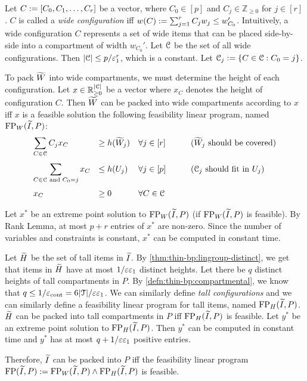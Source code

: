 Let $C := [C_0, C_1, \ldots, C_r]$ be a vector, where
$C_0 \in [p]$ and $C_j \in \mathbb{Z}_{\ge 0}$ for $j \in [r]$.
$C$ is called a \emph{wide configuration} iff
$w(C) := \sum_{j=1}^r C_jw_j \le w_{C_0}'$.
Intuitively, a wide configuration $C$ represents a set of wide items that can be placed
side-by-side into a compartment of width $w_{C_0}'$.
Let $\mathcal{C}$ be the set of all wide configurations.
Then $|\mathcal{C}| \le p/\varepsilon_1^r$, which is a constant.
Let $\mathcal{C}_j := \{C \in \mathcal{C}: C_0 = j\}$.

To pack $\widetilde{W}$ into wide compartments,
we must determine the height of each configuration.
Let $x \in \mathbb{R}_{\ge 0}^{|\mathcal{C}|}$ be a vector where
$x_C$ denotes the height of configuration $C$.
Then $\widetilde{W}$ can be packed into wide compartments according to $x$ iff
$x$ is a feasible solution the following feasibility linear program,
named $\operatorname{FP}_W(\widetilde{I}, P)$:
\[ \begin{array}{*4{>{\displaystyle}l}}
\sum_{C \in \Ccal} C_jx_C &\ge h(\Wtild_j)
    & \forall j \in [r]
    & \qquad\textrm{($\Wtild_j$ should be covered)}
\\[1.75em] \sum_{C \in \Ccal \textrm{ and } C_0 = j} x_C &\le h(U_j)
    & \forall j \in [p]
    & \qquad\textrm{($\Ccal_j$ should fit in $U_j$)}
\\[1.75em] x_C &\ge 0 & \forall C \in \Ccal
\end{array} \]

Let $x^*$ be an extreme point solution to $\operatorname{FP}_W(\widetilde{I}, P)$
(if $\operatorname{FP}_W(\widetilde{I}, P)$ is feasible).
By Rank Lemma, at most $p+r$ entries of $x^*$ are non-zero.
Since the number of variables and constraints is constant,
$x^*$ can be computed in constant time.

Let $\widetilde{H}$ be the set of tall items in $\widetilde{I}$.
By \cref{thm:thin-bp:lingroup-distinct}, we get that items in $\widetilde{H}$
have at most $1/\varepsilon\varepsilon_1$ distinct heights.
Let there be $q$ distinct heights of tall compartments in $P$.
By \cref{defn:thin-bp:compartmental}, we know that $q \le 1/\varepsilon_{\mathrm{cont}} = 6|\mathcal{T}|/\varepsilon\varepsilon_1$.
We can similarly define \emph{tall configurations} and we can similarly define
a feasibility linear program for tall items, named $\operatorname{FP}_H(\widetilde{I}, P)$.
$\widetilde{H}$ can be packed into tall compartments in $P$ iff $\operatorname{FP}_H(\widetilde{I}, P)$ is feasible.
Let $y^*$ be an extreme point solution to $\operatorname{FP}_H(\widetilde{I}, P)$.
Then $y^*$ can be computed in constant time and
$y^*$ has at most $q + 1/\varepsilon\varepsilon_1$ positive entries.

Therefore, $\widetilde{I}$ can be packed into $P$ iff the feasibility linear program
$\operatorname{FP}(\widetilde{I}, P) := \operatorname{FP}_W(\widetilde{I}, P) \wedge \operatorname{FP}_H(\widetilde{I}, P)$ is feasible.

